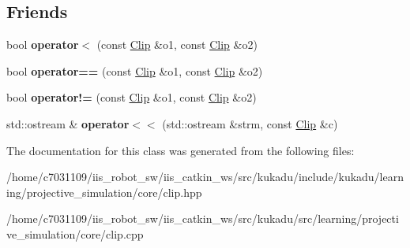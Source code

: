 \subsection*{Friends}
\begin{DoxyCompactItemize}
\item 
\hypertarget{classkukadu_1_1Clip_afa49def0694b1872fe61d573e16d05b5}{bool {\bfseries operator$<$} (const \hyperlink{classkukadu_1_1Clip}{Clip} \&o1, const \hyperlink{classkukadu_1_1Clip}{Clip} \&o2)}\label{classkukadu_1_1Clip_afa49def0694b1872fe61d573e16d05b5}

\item 
\hypertarget{classkukadu_1_1Clip_a72090efb6ab8a7595cab10f6d925abd4}{bool {\bfseries operator==} (const \hyperlink{classkukadu_1_1Clip}{Clip} \&o1, const \hyperlink{classkukadu_1_1Clip}{Clip} \&o2)}\label{classkukadu_1_1Clip_a72090efb6ab8a7595cab10f6d925abd4}

\item 
\hypertarget{classkukadu_1_1Clip_a6e577ddd795af4bf2cfe74ea14c3b7bc}{bool {\bfseries operator!=} (const \hyperlink{classkukadu_1_1Clip}{Clip} \&o1, const \hyperlink{classkukadu_1_1Clip}{Clip} \&o2)}\label{classkukadu_1_1Clip_a6e577ddd795af4bf2cfe74ea14c3b7bc}

\item 
\hypertarget{classkukadu_1_1Clip_a01b9c25753a11dcefcbfc0827f876444}{std\-::ostream \& {\bfseries operator$<$$<$} (std\-::ostream \&strm, const \hyperlink{classkukadu_1_1Clip}{Clip} \&c)}\label{classkukadu_1_1Clip_a01b9c25753a11dcefcbfc0827f876444}

\end{DoxyCompactItemize}


The documentation for this class was generated from the following files\-:\begin{DoxyCompactItemize}
\item 
/home/c7031109/iis\-\_\-robot\-\_\-sw/iis\-\_\-catkin\-\_\-ws/src/kukadu/include/kukadu/learning/projective\-\_\-simulation/core/clip.\-hpp\item 
/home/c7031109/iis\-\_\-robot\-\_\-sw/iis\-\_\-catkin\-\_\-ws/src/kukadu/src/learning/projective\-\_\-simulation/core/clip.\-cpp\end{DoxyCompactItemize}

